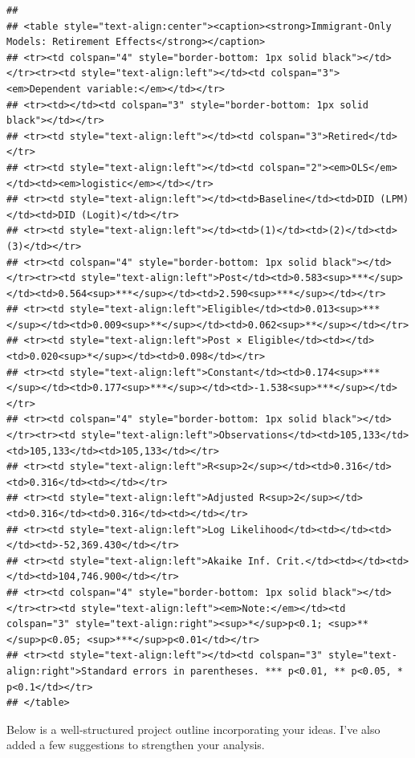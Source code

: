 \documentclass[
]{article}
\begin{document}
\begin{verbatim}
## 
## <table style="text-align:center"><caption><strong>Immigrant-Only Models: Retirement Effects</strong></caption>
## <tr><td colspan="4" style="border-bottom: 1px solid black"></td></tr><tr><td style="text-align:left"></td><td colspan="3"><em>Dependent variable:</em></td></tr>
## <tr><td></td><td colspan="3" style="border-bottom: 1px solid black"></td></tr>
## <tr><td style="text-align:left"></td><td colspan="3">Retired</td></tr>
## <tr><td style="text-align:left"></td><td colspan="2"><em>OLS</em></td><td><em>logistic</em></td></tr>
## <tr><td style="text-align:left"></td><td>Baseline</td><td>DID (LPM)</td><td>DID (Logit)</td></tr>
## <tr><td style="text-align:left"></td><td>(1)</td><td>(2)</td><td>(3)</td></tr>
## <tr><td colspan="4" style="border-bottom: 1px solid black"></td></tr><tr><td style="text-align:left">Post</td><td>0.583<sup>***</sup></td><td>0.564<sup>***</sup></td><td>2.590<sup>***</sup></td></tr>
## <tr><td style="text-align:left">Eligible</td><td>0.013<sup>***</sup></td><td>0.009<sup>**</sup></td><td>0.062<sup>**</sup></td></tr>
## <tr><td style="text-align:left">Post × Eligible</td><td></td><td>0.020<sup>*</sup></td><td>0.098</td></tr>
## <tr><td style="text-align:left">Constant</td><td>0.174<sup>***</sup></td><td>0.177<sup>***</sup></td><td>-1.538<sup>***</sup></td></tr>
## <tr><td colspan="4" style="border-bottom: 1px solid black"></td></tr><tr><td style="text-align:left">Observations</td><td>105,133</td><td>105,133</td><td>105,133</td></tr>
## <tr><td style="text-align:left">R<sup>2</sup></td><td>0.316</td><td>0.316</td><td></td></tr>
## <tr><td style="text-align:left">Adjusted R<sup>2</sup></td><td>0.316</td><td>0.316</td><td></td></tr>
## <tr><td style="text-align:left">Log Likelihood</td><td></td><td></td><td>-52,369.430</td></tr>
## <tr><td style="text-align:left">Akaike Inf. Crit.</td><td></td><td></td><td>104,746.900</td></tr>
## <tr><td colspan="4" style="border-bottom: 1px solid black"></td></tr><tr><td style="text-align:left"><em>Note:</em></td><td colspan="3" style="text-align:right"><sup>*</sup>p<0.1; <sup>**</sup>p<0.05; <sup>***</sup>p<0.01</td></tr>
## <tr><td style="text-align:left"></td><td colspan="3" style="text-align:right">Standard errors in parentheses. *** p<0.01, ** p<0.05, * p<0.1</td></tr>
## </table>
\end{verbatim}

Below is a well‐structured project outline incorporating your ideas.
I've also added a few suggestions to strengthen your analysis.
\end{document}
